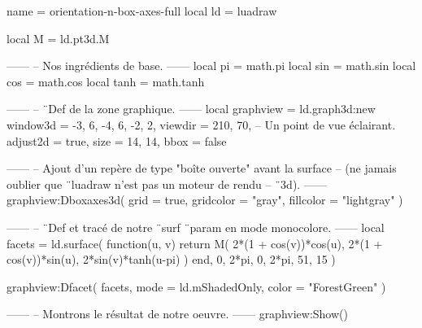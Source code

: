 \documentclass[border = 3pt]{standalone}
\begin{document}
\begin{luadraw*}{name = orientation-n-box-axes-full}
local ld = luadraw

local M = ld.pt3d.M

------
-- Nos ingrédients de base.
------
local pi   = math.pi
local sin  = math.sin
local cos  = math.cos
local tanh = math.tanh

------
-- ¨Def de la zone graphique.
------
local graphview = ld.graph3d:new{
  window3d = {-3, 6, -4, 6, -2, 2},
  viewdir  = {210, 70},  -- Un point de vue éclairant.
  adjust2d = true,
  size     = {14, 14},
  bbox     = false
}

------
-- Ajout d'un repère de type "boîte ouverte" avant la surface
-- (ne jamais oublier que ¨luadraw n'est pas un moteur de rendu
-- ¨3d).
------
graphview:Dboxaxes3d({
  grid      = true,
  gridcolor = "gray",
  fillcolor = "lightgray"
})

------
-- ¨Def et tracé de notre ¨surf ¨param en mode monocolore.
------
local facets = ld.surface(
  function(u, v)
    return M(
      2*(1 + cos(v))*cos(u),
      2*(1 + cos(v))*sin(u),
      2*sin(v)*tanh(u-pi)
    )
  end,
  0, 2*pi, 0, 2*pi,
  {51, 15}
)

graphview:Dfacet(
  facets,
  {
    mode  = ld.mShadedOnly,
    color = "ForestGreen"
  }
)

------
-- Montrons le résultat de notre oeuvre.
------
graphview:Show()
\end{luadraw*}
\end{document}

